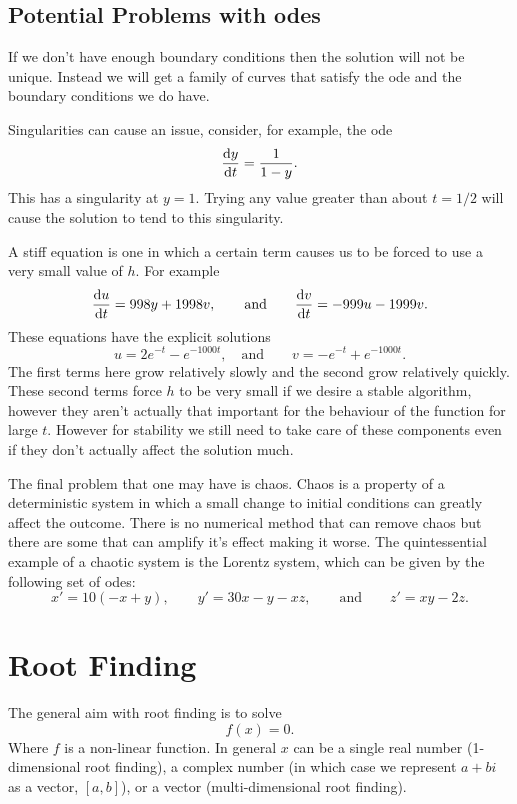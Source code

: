 \documentclass[a4paper]{article}
\begin{document}
    \subsection{Potential Problems with \glspl{ode}}
    If we don't have enough boundary conditions then the solution will not be unique.
    Instead we will get a family of curves that satisfy the \gls{ode} and the boundary conditions we do have.
    
    Singularities can cause an issue, consider, for example, the \gls{ode}
    \[\dv{y}{t} = \frac{1}{1 - y}.\]
    This has a singularity at \(y = 1\).
    Trying any value greater than about \(t = 1/2\) will cause the solution to tend to this singularity.
    
    A stiff equation is one in which a certain term causes us to be forced to use a very small value of \(h\).
    For example
    \[\dv{u}{t} = 998y + 1998v,\qquad\text{and}\qquad \dv{v}{t} = -999u - 1999v.\]
    These equations have the explicit solutions
    \[u = 2e^{-t} - e^{-1000t},\quad\text{and}\qquad v = -e^{-t} + e^{-1000t}.\]
    The first terms here grow relatively slowly and the second grow relatively quickly.
    These second terms force \(h\) to be very small if we desire a stable algorithm, however they aren't actually that important for the behaviour of the function for large \(t\).
    However for stability we still need to take care of these components even if they don't actually affect the solution much.
    
    The final problem that one may have is chaos.
    Chaos is a property of a deterministic system in which a small change to initial conditions can greatly affect the outcome.
    There is no numerical method that can remove chaos but there are some that can amplify it's effect making it worse.
    The quintessential example of a chaotic system is the Lorentz system, which can be given by the following set of \glspl{ode}:
    \[x' = 10(-x + y),\qquad y' = 30x - y - xz,\qquad\text{and}\qquad z' = xy - 2z.\]
    
    \section{Root Finding}
    The general aim with root finding is to solve
    \[f(x) = 0.\]
    Where \(f\) is a non-linear function.
    In general \(x\) can be a single real number (1-dimensional root finding), a complex number (in which case we represent \(a + bi\) as a vector, \([a, b]\)), or a vector (multi-dimensional root finding).
    
\end{document}
